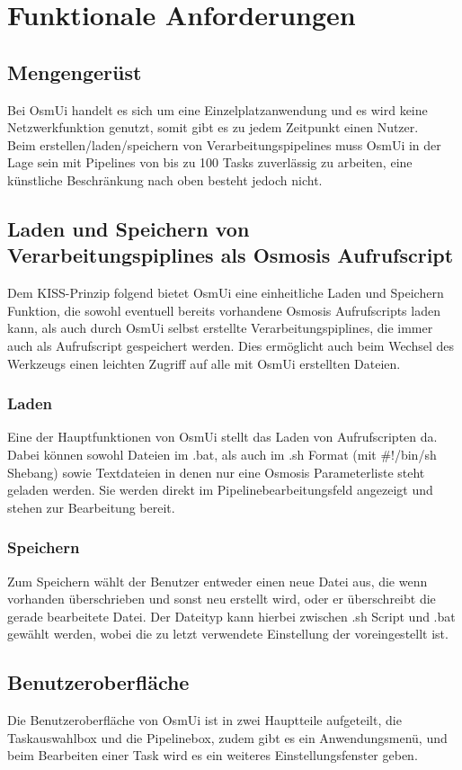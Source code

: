 \documentclass[a4paper,10pt]{scrartcl}
\begin{document}
\section{Funktionale Anforderungen}
\subsection{Mengengerüst}
Bei OsmUi handelt es sich um eine Einzelplatzanwendung und es wird keine Netzwerkfunktion genutzt, somit gibt es zu jedem Zeitpunkt einen Nutzer.\\
Beim erstellen/laden/speichern von Verarbeitungspipelines muss OsmUi in der Lage sein mit Pipelines von bis zu 100 Tasks zuverlässig zu arbeiten,
eine künstliche Beschränkung nach oben besteht jedoch nicht.
\subsection{Laden und Speichern von Verarbeitungspiplines als Osmosis Aufrufscript}
Dem KISS-Prinzip folgend bietet OsmUi eine einheitliche Laden und Speichern Funktion, die sowohl eventuell bereits vorhandene Osmosis Aufrufscripts
laden kann, als auch durch OsmUi selbst erstellte Verarbeitungspiplines, die immer auch als Aufrufscript gespeichert werden. 
Dies ermöglicht auch beim Wechsel des Werkzeugs einen leichten Zugriff auf alle mit OsmUi erstellten Dateien.
\subsubsection{Laden}
Eine der Hauptfunktionen von OsmUi stellt das Laden von Aufrufscripten da. Dabei können sowohl Dateien im .bat, als auch im .sh Format (mit \#!/bin/sh Shebang)
sowie Textdateien in denen nur eine Osmosis Parameterliste steht geladen werden. Sie werden direkt im Pipelinebearbeitungsfeld angezeigt und
stehen zur Bearbeitung bereit.
\subsubsection{Speichern}
Zum Speichern wählt der Benutzer entweder einen neue Datei aus, die wenn vorhanden überschrieben und sonst neu erstellt wird, oder er überschreibt die gerade bearbeitete Datei.
Der Dateityp kann hierbei zwischen .sh Script und .bat gewählt werden, wobei die zu letzt verwendete Einstellung der voreingestellt ist.

\subsection{Benutzeroberfläche}
Die Benutzeroberfläche von OsmUi ist in zwei Hauptteile aufgeteilt, die Taskauswahlbox und die Pipelinebox, zudem gibt es ein Anwendungsmenü, und beim Bearbeiten einer Task wird es ein weiteres Einstellungsfenster
geben.
\end{document}
